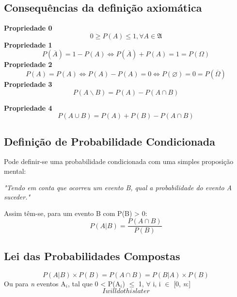 \documentclass[a4paper,12pt]{article}
\let\empty\varnothing
\let\eqv\Longleftrightarrow
\begin{document}
		\subsection{Consequências da definição axiomática}
		\begin{center}
			{\bfseries Propriedade 0}
			\begin{equation}
				0 \geq P(A) \leq 1 , \forall A \in \mathfrak{A}
			\end{equation}
			{\bfseries Propriedade 1}
			\begin{equation}
				P(\overline{A})=1-P(A) \eqv P(\overline{A})+P(A)=1 = P(\Omega) 
			\end{equation}
			{\bfseries Propriedade 2}
                          \begin{equation}
                                  P(A)=P(A) \eqv P(A)-P(A)=0 \eqv P(\empty)=0=P(\overline{\Omega}) 
                          \end{equation}
			{\bfseries Propriedade 3}
                        \begin{equation}
                                  P(A\backslash B) = P(A)-P(A \cap B)
                        \end{equation}
			                             
                        {\bfseries Propriedade 4}
                          \begin{equation}
                                  P(A\cup B)= P(A)+P(B)-P(A\cap B)
                          \end{equation}
		\end{center}
		\subsection{Definição de Probabilidade Condicionada}
			Pode definir-se uma probabilidade condicionada com uma simples proposição mental:
			\begin{center}
				\textit{"Tendo em conta que ocorreu um evento B, qual a probabilidade do evento A suceder."}
			\end{center}
			Assim têm-se, para um evento B com P(B) > 0:
			\begin{equation}
				P(A|B)=\frac{P(A \cap B)}{P(B)}
			\end{equation}
			\subsection{Lei das Probabilidades Compostas}
				\begin{equation}
                                	P(A|B) \times P(B) = P(A \cap B) = P(B|A) \times P(B)
				\end{equation}
	Ou para \textit{n} eventos A$_i$, tal que 0 < P(A$_i$) $\leq$ 1, $\forall$ i, i $\in$ [0, \textit{n}:] 
				\begin{equation}
                			I will do this later
                                \end{equation}
\end{document}
